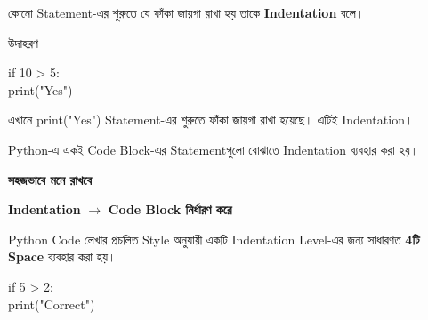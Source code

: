 কোনো Statement-এর শুরুতে যে ফাঁকা জায়গা রাখা হয় তাকে
\textbf{Indentation} বলে।

\begin{examplebox}{উদাহরণ}

\begin{codebox}

\begin{english}
\ttfamily
if 10 > 5:\\
\hspace*{4mm}print("Yes")
\end{english}

\end{codebox}

এখানে
\textenglish{\ttfamily print("Yes")}
Statement-এর শুরুতে ফাঁকা জায়গা রাখা হয়েছে।
এটিই Indentation।

\end{examplebox}

Python-এ একই Code Block-এর Statementগুলো বোঝাতে
Indentation ব্যবহার করা হয়।

\begin{rememberbox}

\textbf{\color{deepOrange}সহজভাবে মনে রাখবে}

\begin{center}

\textbf{Indentation}
\(\longrightarrow\)
\textbf{Code Block নির্ধারণ করে}

\end{center}

\end{rememberbox}



Python Code লেখার প্রচলিত Style অনুযায়ী একটি Indentation
Level-এর জন্য সাধারণত \textbf{4টি Space} ব্যবহার করা হয়।

\begin{codebox}

\begin{english}
\ttfamily
if 5 > 2:\\
\hspace*{4mm}print("Correct")
\end{english}

\end{codebox}

